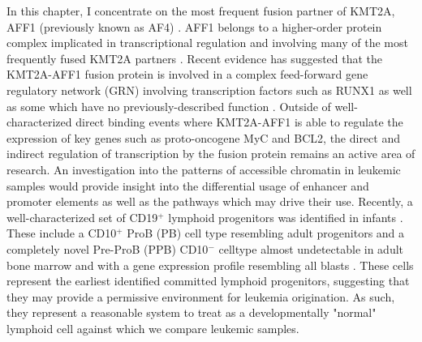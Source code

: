 In this chapter, I concentrate on the most frequent fusion partner of KMT2A, AFF1 (previously known as AF4) \cite{Meyer2017}. AFF1 belongs to a higher-order protein complex implicated in transcriptional regulation and involving many of the most frequently fused KMT2A partners \cite{Yokoyama2010}. 
Recent evidence has suggested that the KMT2A-AFF1 fusion protein is involved in a complex feed-forward gene regulatory network (GRN) involving transcription factors such as RUNX1 as well as some which have no previously-described function \cite{Harman2021, Wilkinson2013}. 
Outside of well-characterized direct binding events where KMT2A-AFF1 is able to regulate the expression of key genes such as proto-oncogene MyC and BCL2, the direct and indirect regulation of transcription by the fusion protein remains an active area of research. 
An investigation into the patterns of accessible chromatin in leukemic samples would provide insight into the differential usage of enhancer and promoter elements as well as the pathways which may drive their use. 
Recently, a well-characterized set of CD19$^+$ lymphoid progenitors was identified in infants \cite{OByrne2019}. 
These include a CD10$^+$ ProB (PB) cell type resembling adult progenitors and a completely novel Pre-ProB (PPB) CD10$^-$ celltype almost undetectable in adult bone marrow and with a gene expression profile resembling \gls{all} blasts \cite{OByrne2019}. 
These cells represent the earliest identified committed lymphoid progenitors, suggesting that they may provide a permissive environment for leukemia origination. 
As such, they represent a reasonable system to treat as a developmentally "normal" lymphoid cell against which we compare leukemic samples.


